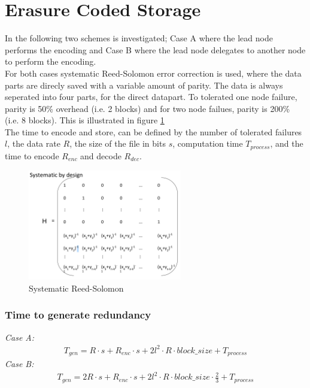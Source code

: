 \section{Erasure Coded Storage} \label{sec:ec}
In the following two schemes is investigated; Case A where the lead node performs the encoding and Case B where the lead node delegates to another node to perform the encoding.\\
For both cases systematic Reed-Solomon error correction is used, where the data parts are direcly saved with a variable amount of parity. The data is always seperated into four parts, for the direct datapart. To tolerated one node failure, parity is 50\% overhead (i.e. 2 blocks) and for two node failues, parity is 200\% (i.e. 8 blocks). This is illustrated in figure \ref{fig:rs_sys}\\
The time to encode and store, can be defined by the number of tolerated failures $l$, the data rate $R$, the size of the file in bits $s$, computation time $T_{process}$, and the time to encode $R_{enc}$ and decode $R_{dec}$.

\begin{figure}[H]
	\centering
	\includegraphics[width=0.6\textwidth]{figures/rs_sys}
	\caption{Systematic Reed-Solomon}
	\label{fig:rs_sys}
\end{figure}

\subsubsection*{Time to generate redundancy}
\textit{Case A:} 
\begin{align}
    T_{gen} = R \cdot s + R_{enc} \cdot s + 2l^{2} \cdot R \cdot block\_size + T_{process}
\end{align}
\textit{Case B:} 
\begin{align}
    T_{gen} = 2R \cdot s + R_{enc} \cdot s + 2l^{2} \cdot R \cdot block\_size \cdot \frac{2}{3} + T_{process}
\end{align}


